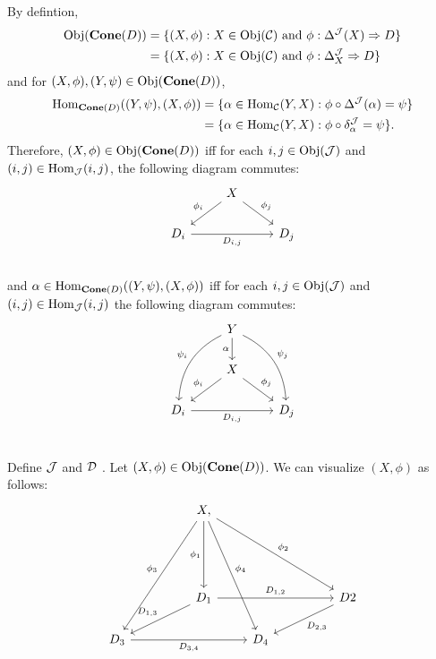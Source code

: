 \documentclass{book}
\begin{document}
	\begin{note}
		By defintion,
		\begin{align*}
			\operatorname{Obj}(\operatorname*{\text{\textbf{Cone}}}(D)) 
			& = \{(X, \phi): X \in \operatorname{Obj}(\mathcal{C}) \text{ and } \phi: \Delta^{\mathcal{J}}(X) \Rightarrow D\} \\
			& = \{(X, \phi): X \in \operatorname{Obj}(\mathcal{C}) \text{ and } \phi: \Delta^{\mathcal{J}}_X \Rightarrow D\}
		\end{align*}
		and for $(X, \phi), (Y, \psi) \in \operatorname{Obj}(\operatorname*{\text{\textbf{Cone}}}(D))$,
		\begin{align*}
			\operatorname{Hom}_{\operatorname*{\text{\textbf{Cone}}}(D)}((Y, \psi), (X, \phi)) 
			& = \{\alpha \in \operatorname{Hom}_{\mathcal{C}}(Y, X): \phi \circ \Delta^{\mathcal{J}}(\alpha) = \psi \} \\
			& = \{\alpha \in \operatorname{Hom}_{\mathcal{C}}(Y, X): \phi \circ \delta^{\mathcal{J}}_{\alpha} = \psi \}.
		\end{align*}
		Therefore, $(X, \phi) \in \operatorname{Obj}(\operatorname*{\text{\textbf{Cone}}}(D))$ iff for each $i,j \in \operatorname{Obj}(\mathcal{J})$ and $(i,j) \in \operatorname{Hom}_{\mathcal{J}}(i, j)$, the following diagram commutes:
		\[ 
		\begin{tikzcd}
			&  X \arrow[dl, "\phi_i"']  \arrow[dr, "\phi_j"] & \\
			D_i  \arrow[rr, "D_{i,j}"'] &&  D_j \\ 
		\end{tikzcd}
		\]  
		and $\alpha \in \operatorname{Hom}_{\operatorname*{\text{\textbf{Cone}}}(D)}((Y, \psi), (X, \phi))$ iff  for each $i,j \in \operatorname{Obj}(\mathcal{J})$ and $(i,j) \in \operatorname{Hom}_{\mathcal{J}}(i, j)$ the following diagram commutes: 
		\[ 
		\begin{tikzcd}
			& Y \arrow[d, "\al"'] \arrow[bend right=30, swap]{ddl}{\psi_i} \arrow[bend left=30]{ddr}{\psi_j} \\
			&  X \arrow[dl, "\phi_i"']  \arrow[dr, "\phi_j"] & \\
			D_i  \arrow[rr, "D_{i,j}"'] &&  D_j \\ 
		\end{tikzcd}
		\]
	\end{note}

	\begin{exmp}
		Define $\mathcal{J}$ and $\mathcal{D}$ . Let $(X, \phi) \in \operatorname{Obj}(\operatorname*{\text{\textbf{Cone}}}(D))$. We can visualize $(X, \phi)$ as follows:
		\[
		\begin{tikzcd}
			&  &  X \arrow[ddd, "\phi_1"'] \arrow[ddddll, "\phi_3"']  \arrow[dddrrr, "\phi_2"], \arrow[ddddr, "\phi_4"] &       &    \\
			&       &     &       &    \\
			&       &     &       &    \\
			&       &  D_1  \arrow[dll, "D_{1,3}"'] \arrow[rrr, "D_{1,2}"]    &       & &  D2 \arrow[dll, "D_{2,3}"] \\
			D_3 \arrow[rrr, "D_{3,4}"'] &       &     &  D_4  &    \\
		\end{tikzcd}
		\]
	\end{exmp}
	
\end{document}
